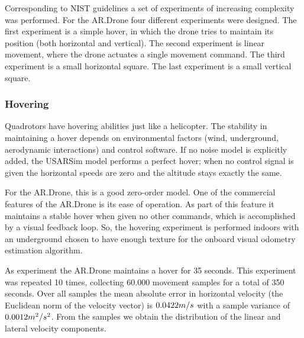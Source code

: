 Corresponding to NIST guidelines \cite{Jacoff2010STM}
a set of experiments of increasing complexity was performed. For the AR.Drone
four different experiments were designed.
The first experiment is a simple hover, in which the drone tries to maintain its position (both horizontal and vertical). The second experiment is linear movement, where the drone actuates a single movement command. The third experiment is a small horizontal square. The last experiment is a small vertical square.

\subsubsection{Hovering}

Quadrotors have hovering abilities just like a helicopter. The stability in maintaining a hover depends
on environmental factors (wind, underground, aerodynamic interactions) and control software.
If no noise model is explicitly added, the USARSim model performs a perfect hover; when no control signal is given the
horizontal speeds are zero and the altitude stays exactly the same.

For the AR.Drone, this is a good zero-order model. One of the commercial features of the AR.Drone is its ease of operation. As part of this feature it
maintains a stable hover when given no other commands, which is accomplished by a visual feedback loop.
So, the hovering experiment is performed  
indoors
with an underground chosen to have enough texture for the onboard visual odometry estimation algorithm.

As experiment the AR.Drone maintains a hover for 35 seconds. This experiment was repeated 10 times,
collecting 60.000 movement samples for a total of 350 seconds. Over all samples the mean absolute error in horizontal
velocity (the Euclidean norm of the velocity vector) is $0.0422\small{m/s}$ with a sample variance of $0.0012\small{m^2/s^2}$. From
the samples we obtain the distribution of the linear and lateral velocity components. 

